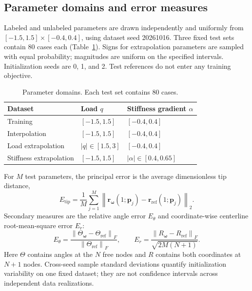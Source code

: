 \documentclass[11pt,a4paper]{article}
\newcommand{\norm}[1]{\left\lVert #1\right\rVert}
\begin{document}
\subsection{Parameter domains and error measures}
Labeled and unlabeled parameters are drawn independently and uniformly from $[-1.5,1.5]\times[-0.4,0.4]$, using dataset seed 20261016. Three fixed test sets contain 80 cases each (Table~\ref{tab:domains}). Signs for extrapolation parameters are sampled with equal probability; magnitudes are uniform on the specified intervals. Initialization seeds are 0, 1, and 2. Test references do not enter any training objective.
\begin{table}[htbp]
 \centering\small
 \caption{Parameter domains. Each test set contains 80 cases.}\label{tab:domains}
 \begin{tabular}{lll}\toprule
 Dataset & Load $q$ & Stiffness gradient $\alpha$\\\midrule
 Training & $[-1.5,1.5]$ & $[-0.4,0.4]$\\
 Interpolation & $[-1.5,1.5]$ & $[-0.4,0.4]$\\
 Load extrapolation & $|q|\in[1.5,3]$ & $[-0.4,0.4]$\\
 Stiffness extrapolation & $[-1.5,1.5]$ & $|\alpha|\in[0.4,0.65]$\\\bottomrule
 \end{tabular}
\end{table}
For $M$ test parameters, the principal error is the average dimensionless tip distance,
\begin{equation}
 E_{\mathrm{tip}}=\frac1M\sum_{j=1}^M
 \norm{\mathbf r_{\boldsymbol\omega}(1;\mathbf p_j)-\mathbf r_{\mathrm{ref}}(1;\mathbf p_j)}_2.
 \label{eq:tipmetric}
\end{equation}
Secondary measures are the relative angle error $E_\theta$ and coordinate-wise centerline root-mean-square error $E_r$:
\begin{equation}
 E_\theta=\frac{\norm{\Theta_{\boldsymbol\omega}-\Theta_{\mathrm{ref}}}_F}{\norm{\Theta_{\mathrm{ref}}}_F},\qquad
 E_r=\frac{\norm{R_{\boldsymbol\omega}-R_{\mathrm{ref}}}_F}{\sqrt{2M(N+1)}}.
 \label{eq:secondary}
\end{equation}
Here $\Theta$ contains angles at the $N$ free nodes and $R$ contains both coordinates at $N+1$ nodes. Cross-seed sample standard deviations quantify initialization variability on one fixed dataset; they are not confidence intervals across independent data realizations.
\end{document}
